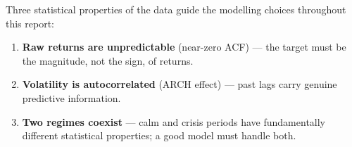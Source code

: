 Three statistical properties of the data guide the modelling choices throughout this
report:
\begin{enumerate}
  \item \textbf{Raw returns are unpredictable} (near-zero ACF) --- the target must be
        the magnitude, not the sign, of returns.
  \item \textbf{Volatility is autocorrelated} (ARCH effect) --- past lags carry genuine
        predictive information.
  \item \textbf{Two regimes coexist} --- calm and crisis periods have fundamentally
        different statistical properties; a good model must handle both.
\end{enumerate}
